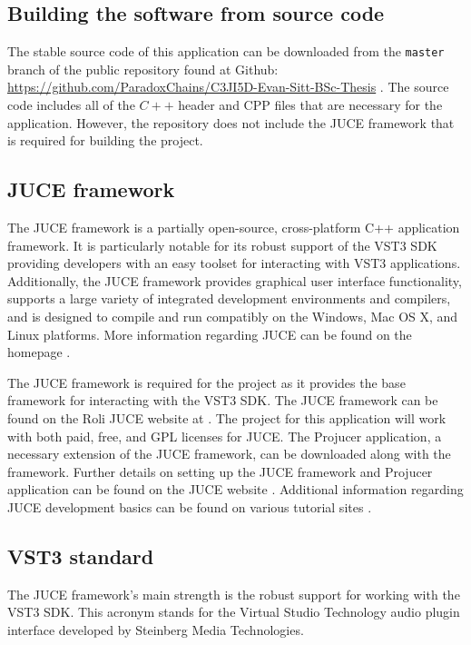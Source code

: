 \documentclass[a4paper,12pt]{report}
\begin{document}
\subsection{Building the software from source code}
\label{subsec:buildingasoftware}
The stable source code of this application can be downloaded from the \texttt{master} branch of the public repository found at Github: \href{https://github.com/ParadoxChains/C3JI5D-Evan-Sitt-BSc-Thesis}{https://github.com/\-ParadoxChains/\-C3JI5D-Evan-Sitt-BSc-Thesis} \cite{github}. The source code includes all of the $C++$ header and CPP files that are necessary for the application. However, the repository does not include the JUCE framework that is required for building the project.

\subsection{JUCE framework}
\label{subsec:juceframework}
The JUCE framework is a partially open-source, cross-platform C++ application framework. It is particularly notable for its robust support of the VST3 SDK providing developers with an easy toolset for interacting with VST3 applications. Additionally, the JUCE framework provides graphical user interface functionality, supports a large variety of integrated development environments and compilers, and is designed to compile and run compatibly on the Windows, Mac OS X, and Linux platforms. More information regarding JUCE can be found on the homepage \cite{madewithjuce}.

The JUCE framework is required for the project as it provides the base framework for interacting with the VST3 SDK. The JUCE framework can be found on the Roli JUCE website at \cite{madewithjuce}. The project for this application will work with both paid, free, and GPL licenses for JUCE. The Projucer application, a necessary extension of the JUCE framework, can be downloaded along with the framework. Further details on setting up the JUCE framework and Projucer application can be found on the JUCE website \cite{madewithjuce}. Additional information regarding JUCE development basics can be found on various tutorial sites \cite{jucevstdevelopment}.

\subsection{VST3 standard}
\label{subsec:vst3standard}
The JUCE framework's main strength is the robust support for working with the VST3 SDK. This acronym stands for the Virtual Studio Technology audio plugin interface developed by Steinberg Media Technologies. 
\end{document}
